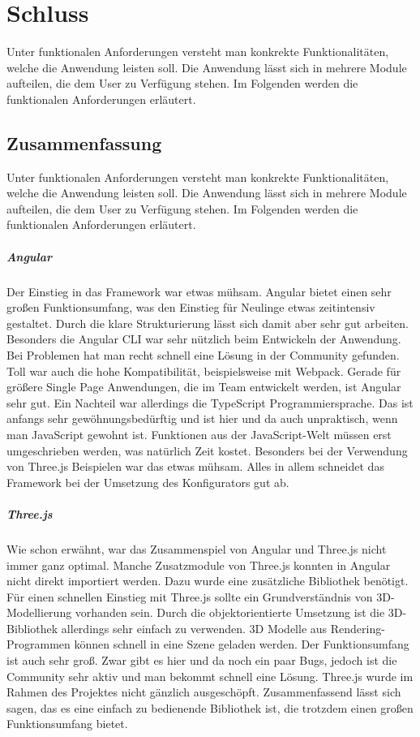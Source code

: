 %
%
%
\chapter{Schluss}
\label{cha:fazit}
%
Unter funktionalen Anforderungen versteht man konkrekte Funktionalitäten, welche die Anwendung leisten soll. Die Anwendung lässt sich in mehrere Module aufteilen, die dem User zu Verfügung stehen. Im Folgenden werden die funktionalen Anforderungen erläutert.
%
\section{Zusammenfassung}
%
Unter funktionalen Anforderungen versteht man konkrekte Funktionalitäten, welche die Anwendung leisten soll. Die Anwendung lässt sich in mehrere Module aufteilen, die dem User zu Verfügung stehen. Im Folgenden werden die funktionalen Anforderungen erläutert.
%
\paragraph{Angular}
Der Einstieg in das Framework war etwas mühsam. Angular bietet einen sehr großen Funktionsumfang, was den Einstieg für Neulinge etwas zeitintensiv gestaltet. Durch die klare Strukturierung lässt sich damit aber sehr gut arbeiten. Besonders die Angular CLI war sehr nützlich beim Entwickeln der Anwendung. Bei Problemen hat man recht schnell eine Lösung in der Community gefunden. Toll war auch die hohe Kompatibilität, beispielsweise mit Webpack. Gerade für größere Single Page Anwendungen, die im Team entwickelt werden, ist Angular sehr gut. Ein Nachteil war allerdings die TypeScript Programmiersprache. Das ist anfangs sehr gewöhnungsbedürftig und ist hier und da auch unpraktisch, wenn man JavaScript gewohnt ist. Funktionen aus der JavaScript-Welt müssen erst umgeschrieben werden, was natürlich Zeit kostet. Besonders bei der Verwendung von Three.js Beispielen war das etwas mühsam. Alles in allem schneidet das Framework bei der Umsetzung des Konfigurators gut ab.
\paragraph{Three.js}
Wie schon erwähnt, war das Zusammenspiel von Angular und Three.js nicht immer ganz optimal. Manche Zusatzmodule von Three.js konnten in Angular nicht direkt importiert werden. Dazu wurde eine zusätzliche Bibliothek benötigt. Für einen schnellen Einstieg mit Three.js sollte ein Grundverständnis von 3D-Modellierung vorhanden sein. Durch die objektorientierte Umsetzung ist die 3D-Bibliothek allerdings sehr einfach zu verwenden. 3D Modelle aus Rendering-Programmen können schnell in eine Szene geladen werden. Der Funktionsumfang ist auch sehr groß. Zwar gibt es hier und da noch ein paar Bugs, jedoch ist die Community sehr aktiv und man bekommt schnell eine Lösung. Three.js wurde im Rahmen des Projektes nicht gänzlich ausgeschöpft. Zusammenfassend lässt sich sagen, das es eine einfach zu bedienende Bibliothek ist, die trotzdem einen großen Funktionsumfang bietet.
